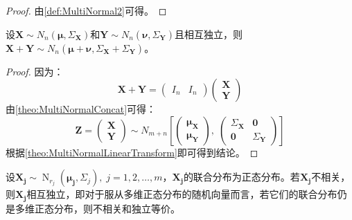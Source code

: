 \begin{proof}
	由\cref{def:MultiNormal2}可得。
\end{proof}
\begin{theorem}\label{theo:MultiNormalAdditivity}
	设$\mathbf{X}\sim N_n(\boldsymbol{\mu},\Sigma_\mathbf{X})$和$\mathbf{Y}\sim N_n(\boldsymbol{\nu},\Sigma_\mathbf{Y})$且相互独立，则$\mathbf{X}+\mathbf{Y}\sim N_n(\boldsymbol{\mu}+\boldsymbol{\nu},\Sigma_\mathbf{X}+\Sigma_\mathbf{Y})$。
\end{theorem}
\begin{proof}
	因为：
	\begin{equation*}
		\mathbf{X}+\mathbf{Y}=
		\begin{pmatrix}
			I_n & I_n
		\end{pmatrix}
		\begin{pmatrix}
			\mathbf{X} \\
			\mathbf{Y}
		\end{pmatrix}
	\end{equation*}
	由\cref{theo:MultiNormalConcat}可得：
	\begin{equation*}
		\mathbf{Z}=
		\begin{pmatrix}
			\mathbf{X} \\
			\mathbf{Y}
		\end{pmatrix}
		\sim N_{m+n}\left[
		\begin{pmatrix}
			\boldsymbol{\mu}_{\mathbf{X}} \\
			\boldsymbol{\mu}_{\mathbf{Y}}
		\end{pmatrix},\;
		\begin{pmatrix}
			\Sigma_\mathbf{X} & \mathbf{0} \\
			\mathbf{0} & \Sigma_\mathbf{Y}
		\end{pmatrix}
		\right]
	\end{equation*}
	根据\cref{theo:MultiNormalLinearTransform}即可得到结论。
\end{proof}
\begin{theorem}\label{theo:IndependentCorrelationNormal}
	设$\mathbf{X_j}\sim\operatorname{N}_{r_j}(\boldsymbol{\mu_j},\Sigma_{j}),\;j=1,2,\dots,m$，$\mathbf{X_j}$的联合分布为正态分布。若$\mathbf{X_j}$不相关，则$\mathbf{X_j}$相互独立，即对于服从多维正态分布的随机向量而言，若它们的联合分布仍是多维正态分布，则不相关和独立等价。
\end{theorem}
